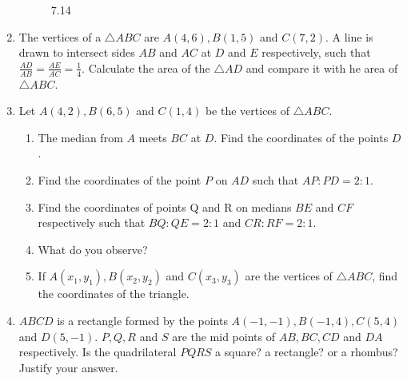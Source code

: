 \documentclass{article}
\theoremstyle{remark}
\begin{document}
\begin{enumerate}
\begin{figure}[ht]
\caption{7.14}
  \label{fig:7.14}
\end{figure}
\item The vertices of a $\triangle ABC$ are $A(4,6), B(1,5)$ and $C(7,2)$. A line is drawn to intersect sides $AB$ and $AC$ at $D$ and $E$ respectively, such that $\frac {AD}{AB}=\frac{AE}{AC}=\frac{1}{4}$. Calculate the area of the $\triangle AD$ and compare it with he area of $\triangle ABC$.
\item Let $A(4,2), B(6,5)$ and $C(1,4)$ be the vertices of $\triangle ABC$.
\begin{enumerate}[label=(\roman*)]
\item The median from $A$ meets $BC$ at $D$. Find the coordinates of the points $D$.
\item Find the coordinates of the point $P$ on $AD$ such that $AP:PD=2:1$.
\item Find the coordinates of points Q and R on medians $BE$ and $CF$ respectively such that $BQ:QE=2:1$ and $CR:RF=2:1$.
\item What do you observe?
\item If $A(x_1,y_1), B(x_2,y_2)$ and $C(x_3,y_3)$ are the vertices of $\triangle ABC$, find the coordinates of the triangle.
\end{enumerate}
\item  $ABCD$ is a rectangle formed by the points  $A(-1,-1), B(-1,4), C(5,4)$ and $D(5,-1)$. $P, Q, R$ and $S$ are the mid points of $AB, BC, CD$ and $DA$ respectively. Is the quadrilateral $PQRS$ a square? a rectangle? or a rhombus? Justify your answer.
\end{enumerate}
\end{document}
